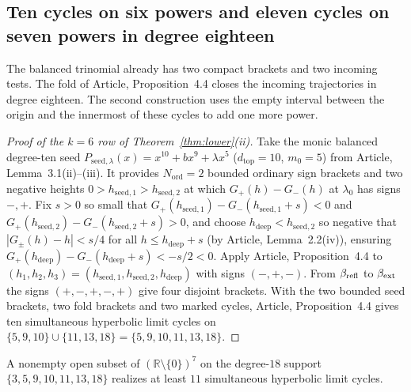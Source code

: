\subsection{Ten cycles on six powers and eleven cycles on seven powers in degree eighteen}\label{subsec:six-power-proof}

The balanced trinomial already has two compact brackets and two
incoming tests. The fold of Article, Proposition~4.4 closes
the incoming trajectories in degree eighteen. The second construction
uses the empty interval between the origin and the innermost of these
cycles to add one more power.

\begin{proof}[Proof of the $k=6$ row of Theorem~\ref{thm:lower}\textup{(ii)}]
Take the monic balanced degree-ten seed $P_{\mathrm{seed},\lambda}(x)=x^{10}+bx^9+\lambda x^5$
($d_{\mathrm{top}}=10$, $m_0=5$) from Article, Lemma~3.1(ii)--(iii). It provides
$N_{\mathrm{ord}}=2$ bounded ordinary sign brackets and two negative heights
$0>h_{\mathrm{seed},1}>h_{\mathrm{seed},2}$ at which $G_+(h)-G_-(h)$ at $\lambda_0$ has signs $-,+$.
Fix $s>0$ so small that $G_+(h_{\mathrm{seed},1})-G_-(h_{\mathrm{seed},1}+s)<0$ and
$G_+(h_{\mathrm{seed},2})-G_-(h_{\mathrm{seed},2}+s)>0$, and choose
$h_{\mathrm{deep}}<h_{\mathrm{seed},2}$ so negative that $|G_\pm(h)-h|<s/4$ for all $h\le
h_{\mathrm{deep}}+s$ (by Article, Lemma~2.2(iv)), ensuring
$G_+(h_{\mathrm{deep}})-G_-(h_{\mathrm{deep}}+s)<-s/2<0$. Apply Article, Proposition~4.4 to
$(h_1,h_2,h_3)=(h_{\mathrm{seed},1},h_{\mathrm{seed},2},h_{\mathrm{deep}})$ with signs $(-,+,-)$.
From $\beta_{\rm refl}$ to $\beta_{\rm ext}$ the signs $(+,-,+,-,+)$
give four disjoint brackets. With the two bounded seed brackets, two
fold brackets and two marked cycles, Article, Proposition~4.4
gives ten simultaneous hyperbolic limit cycles on $\{5,9,10\}\cup\{11,13,18\}=\{5,9,10,11,13,18\}$.
\end{proof}

\begin{corollary}\label{cor:seven-inner}
A nonempty open subset of $(\mathbb{R}\setminus\{0\})^7$ on the degree-$18$ support
$\{3,5,9,10,11,13,18\}$ realizes at least $11$ simultaneous hyperbolic limit cycles.
\end{corollary}

